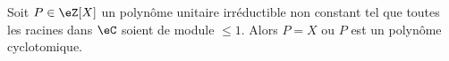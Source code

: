 %
%
%

\begin{theorem} \label{ThojCJpFW}
    Soit \( P\in \eZ[X]\) un polynôme unitaire irréductible non constant tel que toutes les racines dans \( \eC\) soient de module \( \leq 1\). Alors \( P=X\) ou \( P\) est un polynôme cyclotomique.
\end{theorem}

